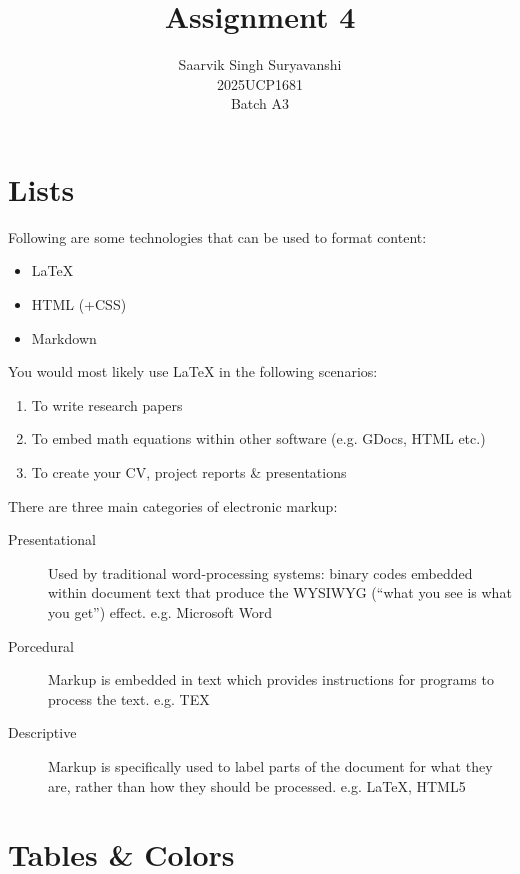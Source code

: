\documentclass[12pt,a4paper]{article}
\title{Assignment 4}
\author{
	Saarvik Singh Suryavanshi \\
	2025UCP1681 \\
	Batch A3
}
\date{}
\begin{document}
	
	\maketitle
	
	\section{Lists}
	
	Following are some technologies that can be used to format content:
	
	\begin{itemize}
		\item \LaTeX
		\item HTML (+CSS)
		\item Markdown
	\end{itemize}
	
	You would most likely use \LaTeX{} in the following scenarios:
	
	\begin{enumerate}
		\item To write research papers
		
		\item To embed math equations within other software
		(e.g. GDocs, HTML etc.)
		
		\item To create your CV, project reports \& presentations
	\end{enumerate}
	
	There are three main categories of electronic markup:
	
	\begin{description}
		
		\item[Presentational]
		Used by traditional word-processing systems: binary codes
		embedded within document text that produce the WYSIWYG
		(``what you see is what you get'') effect.
		e.g. Microsoft Word
		
		\item[Porcedural]
		Markup is embedded in text which provides instructions for
		programs to process the text. e.g. TEX
		
		\item[Descriptive]
		Markup is specifically used to label parts of the document
		for what they are, rather than how they should be processed.
		e.g. \LaTeX, HTML5
		
	\end{description}
	
	
	\section{Tables \& Colors}
	
\end{document}
